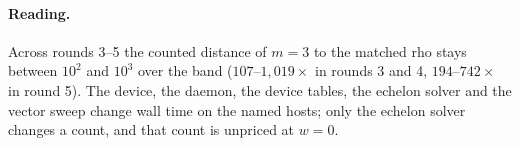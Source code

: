 \paragraph{Reading.} Across rounds 3--5 the counted distance of $m=3$ to
the matched rho stays between $10^2$ and $10^3$ over the band ($107$--$1{,}019\times$
in rounds 3 and 4, $194$--$742\times$ in round 5). The device, the
daemon, the device tables, the echelon solver and the vector sweep change
wall time on the named hosts; only the echelon solver changes a count,
and that count is unpriced at $w=0$.
